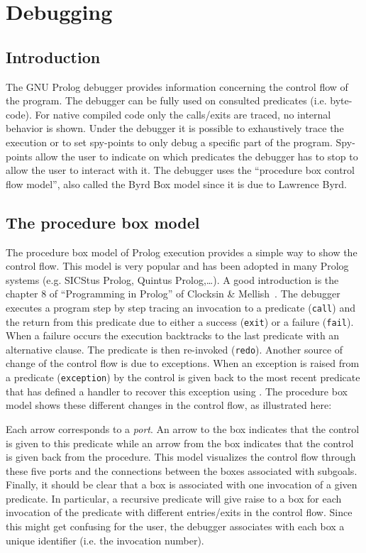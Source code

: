 \newpage
\section{Debugging}
\label{Debugging}
\subsection{Introduction}
The GNU Prolog debugger provides information concerning the control flow of
the program. The debugger can be fully used on consulted predicates (i.e.
byte-code). For native compiled code only the calls/exits are traced, no
internal behavior is shown. Under the debugger it is possible to exhaustively
trace the execution or to set spy-points to only debug a specific part of the
program. Spy-points allow the user to indicate on which predicates the
debugger has to stop to allow the user to interact with it. The debugger uses
the ``procedure box control flow model'', also called the Byrd Box model
since it is due to Lawrence Byrd.

\subsection{The procedure box model}
The procedure box model of Prolog execution provides a simple way to show
the control flow. This model is very popular and has been adopted in many
Prolog systems (e.g. SICStus Prolog, Quintus Prolog,\ldots). A good
introduction is the chapter 8 of ``Programming in Prolog'' of Clocksin \&
Mellish~\cite{Clock}. The debugger executes a program step by step tracing an
invocation to a predicate (\texttt{call}) and the return from this predicate
due to either a success (\texttt{exit}) or a failure (\texttt{fail}). When a
failure occurs the execution backtracks to the last predicate with an
alternative clause. The predicate is then re-invoked (\texttt{redo}).
Another source of change of the control flow is due to exceptions. When an
exception is raised from a predicate (\texttt{exception}) by
  the control is given back to the most
recent predicate that has defined a handler to recover this exception using
 . The procedure box model shows these
different changes in the control flow, as illustrated here:


Each arrow corresponds to a \emph{port}. An arrow to the box indicates
that the control is given to this predicate while an arrow from the box
indicates that the control is given back from the procedure. This model
visualizes the control flow through these five ports and the connections
between the boxes associated with subgoals. Finally, it should be clear that a
box is associated with one invocation of a given predicate. In particular, a
recursive predicate will give raise to a box for each invocation of the
predicate with different entries/exits in the control flow. Since this might
get confusing for the user, the debugger associates with each box a unique
identifier (i.e. the invocation number).

